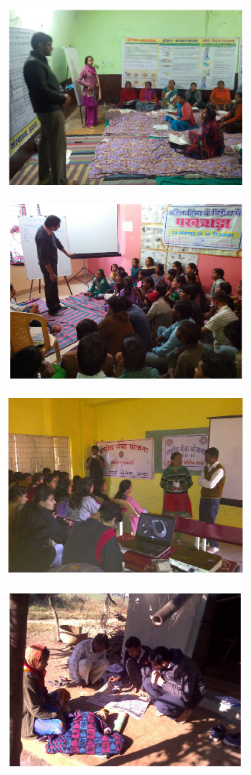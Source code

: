\begin{figure}
	\centering
	\begin{subfigure}{.5\textwidth}
	  	\centering
	  	\includegraphics[width=2.45in]{Appendix1/im1.PNG}
	\end{subfigure}%
	\begin{subfigure}{.5\textwidth}
	  	\centering
	  	\includegraphics[width=2.45in]{Appendix1/im2.PNG}
	\end{subfigure}
	\label{figstart}
\end{figure}
\begin{figure}
	\centering
	\begin{subfigure}{.5\textwidth}
	  	\centering
	  	\includegraphics[width=2.45in]{Appendix1/im3.PNG}
	\end{subfigure}%
	\begin{subfigure}{.5\textwidth}
	  	\centering
	  	\includegraphics[width=2.45in]{Appendix1/im4.PNG}
	\end{subfigure}
	\label{figstart}
\end{figure}
